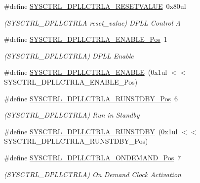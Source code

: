 \begin{DoxyCompactItemize}
\#define \mbox{\hyperlink{group___s_a_m_d21___s_y_s_c_t_r_l_gaa3e447f541b4ccf87c1f2cb0d653536c}{S\+Y\+S\+C\+T\+R\+L\+\_\+\+D\+P\+L\+L\+C\+T\+R\+L\+A\+\_\+\+R\+E\+S\+E\+T\+V\+A\+L\+UE}}~0x80ul
\begin{DoxyCompactList}\small\item\em (S\+Y\+S\+C\+T\+R\+L\+\_\+\+D\+P\+L\+L\+C\+T\+R\+LA reset\+\_\+value) D\+P\+LL Control A \end{DoxyCompactList}\item 
\#define \mbox{\hyperlink{group___s_a_m_d21___s_y_s_c_t_r_l_ga10ad99810754da85abe59581fcd74788}{S\+Y\+S\+C\+T\+R\+L\+\_\+\+D\+P\+L\+L\+C\+T\+R\+L\+A\+\_\+\+E\+N\+A\+B\+L\+E\+\_\+\+Pos}}~1
\begin{DoxyCompactList}\small\item\em (S\+Y\+S\+C\+T\+R\+L\+\_\+\+D\+P\+L\+L\+C\+T\+R\+LA) D\+P\+LL Enable \end{DoxyCompactList}\item 
\#define \mbox{\hyperlink{group___s_a_m_d21___s_y_s_c_t_r_l_ga06e90c966dd32b2e344b2a104ea673e2}{S\+Y\+S\+C\+T\+R\+L\+\_\+\+D\+P\+L\+L\+C\+T\+R\+L\+A\+\_\+\+E\+N\+A\+B\+LE}}~(0x1ul $<$$<$ S\+Y\+S\+C\+T\+R\+L\+\_\+\+D\+P\+L\+L\+C\+T\+R\+L\+A\+\_\+\+E\+N\+A\+B\+L\+E\+\_\+\+Pos)
\item 
\#define \mbox{\hyperlink{group___s_a_m_d21___s_y_s_c_t_r_l_gaf0beb6c4d871a0a1de265640884b7036}{S\+Y\+S\+C\+T\+R\+L\+\_\+\+D\+P\+L\+L\+C\+T\+R\+L\+A\+\_\+\+R\+U\+N\+S\+T\+D\+B\+Y\+\_\+\+Pos}}~6
\begin{DoxyCompactList}\small\item\em (S\+Y\+S\+C\+T\+R\+L\+\_\+\+D\+P\+L\+L\+C\+T\+R\+LA) Run in Standby \end{DoxyCompactList}\item 
\#define \mbox{\hyperlink{group___s_a_m_d21___s_y_s_c_t_r_l_gae210c400ec3652d7ad93416979462ff4}{S\+Y\+S\+C\+T\+R\+L\+\_\+\+D\+P\+L\+L\+C\+T\+R\+L\+A\+\_\+\+R\+U\+N\+S\+T\+D\+BY}}~(0x1ul $<$$<$ S\+Y\+S\+C\+T\+R\+L\+\_\+\+D\+P\+L\+L\+C\+T\+R\+L\+A\+\_\+\+R\+U\+N\+S\+T\+D\+B\+Y\+\_\+\+Pos)
\item 
\#define \mbox{\hyperlink{group___s_a_m_d21___s_y_s_c_t_r_l_gaed8acdc21bcf546f23ad213020ce459f}{S\+Y\+S\+C\+T\+R\+L\+\_\+\+D\+P\+L\+L\+C\+T\+R\+L\+A\+\_\+\+O\+N\+D\+E\+M\+A\+N\+D\+\_\+\+Pos}}~7
\begin{DoxyCompactList}\small\item\em (S\+Y\+S\+C\+T\+R\+L\+\_\+\+D\+P\+L\+L\+C\+T\+R\+LA) On Demand Clock Activation \end{DoxyCompactList}\item 

\end{DoxyCompactItemize}

